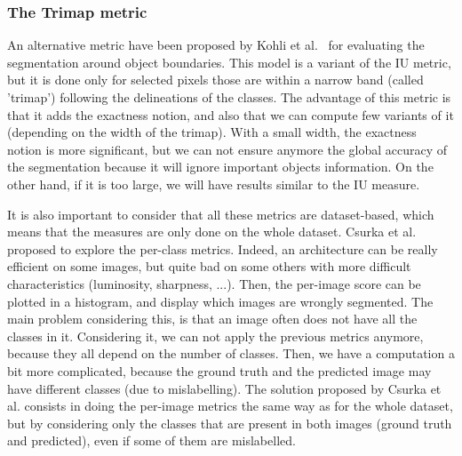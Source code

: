 \subsubsection{The Trimap metric}
An alternative metric have been proposed by Kohli et al.~\cite{KOHL09} for evaluating the segmentation around object boundaries. This model is a variant of the IU metric, but it is done only for selected pixels those are within a narrow band (called 'trimap') following the delineations of the classes. The advantage of this metric is that it adds the exactness notion, and also that we can compute few variants of it (depending on the width of the trimap). With a small width, the exactness notion is more significant, but we can not ensure anymore the global accuracy of the segmentation because it will ignore important objects information. On the other hand, if it is too large, we will have results similar to the IU measure.

It is also important to consider that all these metrics are dataset-based, which means that the measures are only done on the whole dataset. Csurka et al.~\cite{CSUR13} proposed to explore the per-class metrics. Indeed, an architecture can be really efficient on some images, but quite bad on some others with more difficult characteristics (luminosity, sharpness, ...). Then, the per-image score can be plotted in a histogram, and display which images are wrongly segmented. The main problem considering this, is that an image often does not have all the classes in it. Considering it, we can not apply the previous metrics anymore, because they all depend on the number of classes. Then, we have a computation a bit more complicated, because the ground truth and the predicted image may have different classes (due to mislabelling). The solution proposed by Csurka et al. consists in doing the per-image metrics the same way as for the whole dataset, but by considering only the classes that are present in both images (ground truth and predicted), even if some of them are mislabelled.



